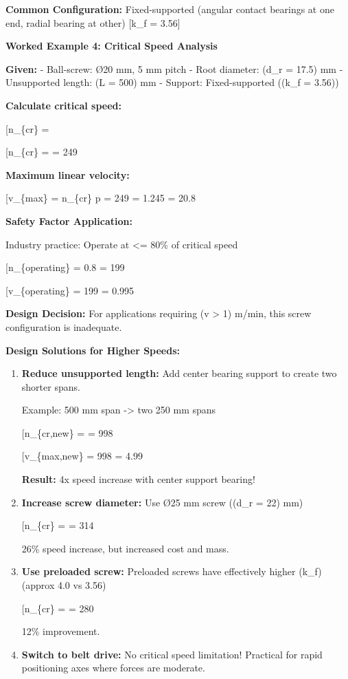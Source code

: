 \documentclass[
]{article}
\begin{document}
\textbf{Common Configuration:} Fixed-supported (angular contact bearings
at one end, radial bearing at other) {[}k\_f = 3.56{]}

\textbf{Worked Example 4: Critical Speed Analysis}

\textbf{Given:} - Ball-screw: Ø20 mm, 5 mm pitch - Root diameter: (d\_r
= 17.5) mm - Unsupported length: (L = 500) mm - Support: Fixed-supported
((k\_f = 3.56))

\textbf{Calculate critical speed:}

{[}n\_\{cr\} = \frac{3.56 \times 10^6 \times 17.5}{500^2}{]}

{[}n\_\{cr\} =  = 249 \text{ rpm}{]}

\textbf{Maximum linear velocity:}

{[}v\_\{max\} = n\_\{cr\} \times p = 249  = 1.245
 = 20.8 \text{ mm/s}{]}

\textbf{Safety Factor Application:}

Industry practice: Operate at \textless= 80\% of critical speed

{[}n\_\{operating\} = 0.8  = 199 \text{ rpm}{]}

{[}v\_\{operating\} = 199  = 0.995  
\text{ m/min}{]}

\textbf{Design Decision:} For applications requiring (v \textgreater{}
1) m/min, this screw configuration is inadequate.

\textbf{Design Solutions for Higher Speeds:}

\begin{enumerate}
\def\labelenumi{\arabic{enumi}.}
\item
  \textbf{Reduce unsupported length:} Add center bearing support to
  create two shorter spans.

  Example: 500 mm span -\textgreater{} two 250 mm spans

  {[}n\_\{cr,new\} =  = 998
  \text{ rpm}{]}

  {[}v\_\{max,new\} = 998  = 4.99 \text{ m/min}{]}

  \textbf{Result:} 4x speed increase with center support bearing!
\item
  \textbf{Increase screw diameter:} Use Ø25 mm screw ((d\_r = 22) mm)

  {[}n\_\{cr\} =  = 314
  \text{ rpm}{]}

  26\% speed increase, but increased cost and mass.
\item
  \textbf{Use preloaded screw:} Preloaded screws have effectively higher
  (k\_f) (approx 4.0 vs 3.56)

  {[}n\_\{cr\} =  = 280
  \text{ rpm}{]}

  12\% improvement.
\item
  \textbf{Switch to belt drive:} No critical speed limitation! Practical
  for rapid positioning axes where forces are moderate.
\end{enumerate}
\end{document}

